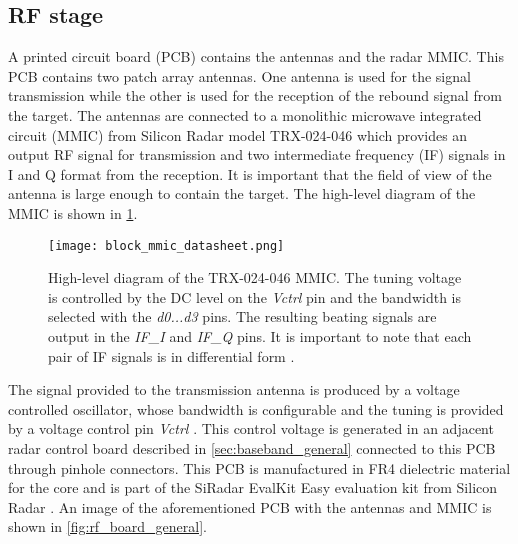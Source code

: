 \subsection{RF stage} \label{sec:rf_board_general}

A printed circuit board (PCB) contains the antennas and the radar MMIC. This PCB contains two patch array antennas. One antenna is used for the signal transmission while the other is used for the reception of the rebound signal from the target. The antennas are connected to a monolithic microwave integrated circuit (MMIC) from Silicon Radar model TRX-024-046 \cite{SR2021} which provides an output RF signal for transmission and two intermediate frequency (IF) signals in I and Q format from the reception. It is important that the field of view of the antenna is large enough to contain the target. The high-level diagram of the MMIC is shown in \cref{fig:block_mmic_general}.

\begin{figure}[ht]
	\centering
	\texttt{[image: block\_mmic\_datasheet.png]}
	\caption[High-level diagram of the TRX-024-046 MMIC. The tuning voltage is controlled by the DC level on the \textit{Vctrl} pin and the bandwidth is selected with the \textit{d0...d3} pins. The resulting beating signals are output in the \textit{IF\_I} and \textit{IF\_Q} pins. It is important to note that each pair of IF signals is in differential form.]{High-level diagram of the TRX-024-046 MMIC. The tuning voltage is controlled by the DC level on the \textit{Vctrl} pin and the bandwidth is selected with the \textit{d0...d3} pins. The resulting beating signals are output in the \textit{IF\_I} and \textit{IF\_Q} pins. It is important to note that each pair of IF signals is in differential form \cite{SR2021}. \label{fig:block_mmic_general}}
\end{figure}

The signal provided to the transmission antenna is produced by a voltage controlled oscillator, whose bandwidth is configurable and the tuning is provided by a voltage control pin \textit{Vctrl} \cite{SR2021}. This control voltage is generated in an adjacent radar control board described in \cref{sec:baseband_general} connected to this PCB through pinhole connectors. This PCB is manufactured in FR4 dielectric material for the core and is part of the SiRadar EvalKit Easy evaluation kit from Silicon Radar \cite{SR2021eval}. An image of the aforementioned PCB with the antennas and MMIC is shown in  \cref{fig:rf_board_general}.


